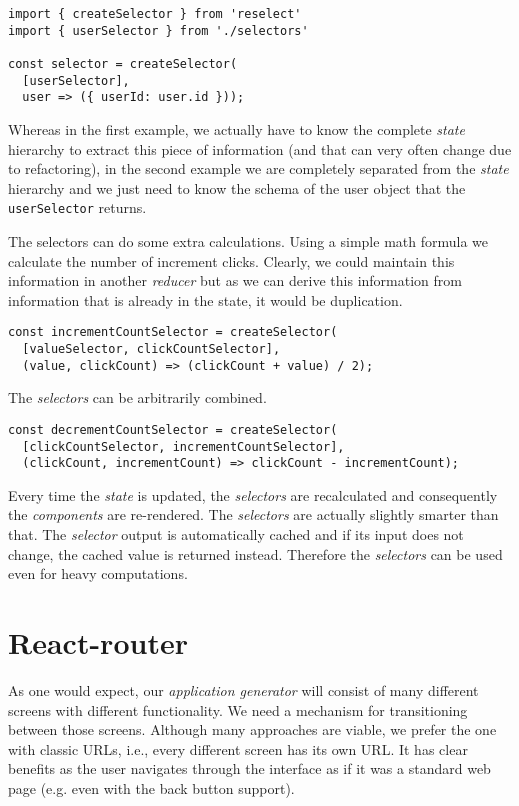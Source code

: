 \begin{verbatim}
import { createSelector } from 'reselect'
import { userSelector } from './selectors'

const selector = createSelector(
  [userSelector],
  user => ({ userId: user.id }));
\end{verbatim}

Whereas in the first example, we actually have to know the complete \emph{state} hierarchy to extract this piece of information (and that can very often change due to refactoring), in the second example we are completely separated from the \emph{state} hierarchy and we just need to know the schema of the user object that the \texttt{userSelector} returns.

The selectors can do some extra calculations. Using a simple math formula we calculate the number of increment clicks. Clearly, we could maintain this information in another \emph{reducer} but as we can derive this information from information that is already in the state, it would be duplication.

\begin{verbatim}
const incrementCountSelector = createSelector(
  [valueSelector, clickCountSelector],
  (value, clickCount) => (clickCount + value) / 2);
\end{verbatim}

The \emph{selectors} can be arbitrarily combined.

\begin{verbatim}
const decrementCountSelector = createSelector(
  [clickCountSelector, incrementCountSelector],
  (clickCount, incrementCount) => clickCount - incrementCount);
\end{verbatim}

Every time the \emph{state} is updated, the \emph{selectors} are recalculated and consequently the \emph{components} are re-rendered. The \emph{selectors} are actually slightly smarter than that. The \emph{selector} output is automatically cached and if its input does not change, the cached value is returned instead. Therefore the \emph{selectors} can be used even for heavy computations.

\section{React-router}

As one would expect, our \emph{application generator} will consist of many different screens with different functionality. We need a mechanism for transitioning between those screens. Although many approaches are viable, we prefer the one with classic URLs, i.e., every different screen has its own URL. It has clear benefits as the user navigates through the interface as if it was a standard web page (e.g. even with the back button support).

